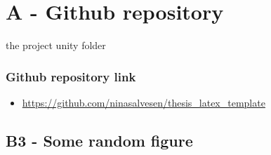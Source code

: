 

\chapter*{A - Github repository}

the project unity folder 


\subsection*{Github repository link}
\begin{itemize}
    \item \url{https://github.com/ninasalvesen/thesis_latex_template}
\end{itemize}



\newpage
\section*{\large{B3 - Some random figure}}
\vspace*{1cm}





